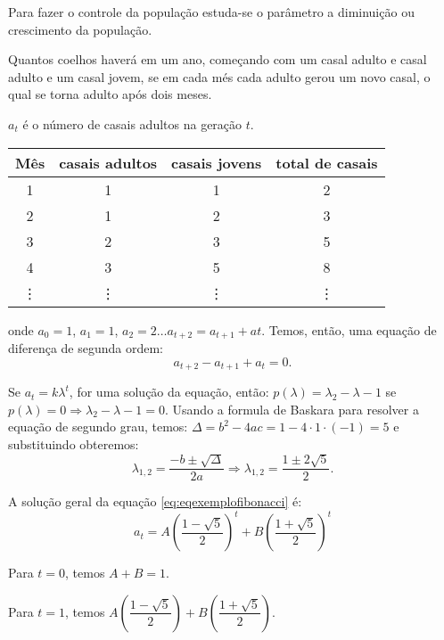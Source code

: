 \begin{remark}
Para fazer o controle da população estuda-se o parâmetro a diminuição ou crescimento da população.
\end{remark}

\begin{example}
Quantos coelhos haverá em um ano, começando com um casal adulto e casal adulto e um casal jovem, se em cada més cada adulto gerou um novo casal, o qual se torna adulto após dois meses. 

$a_t$ é o número de casais adultos na geração $t$.
\end{example}


\begin{table}[!h]\centering
\begin{tabular}{|c|c|c|c|} \hline
Mês & casais adultos & casais jovens & total de casais \\ \hline
1 & 1 & 1 & 2 \\ \hline
2 & 1 & 2 & 3 \\ \hline
3 & 2 & 3 & 5 \\ \hline
4 & 3 & 5 & 8 \\ \hline
\vdots & \vdots & \vdots & \vdots \\ \hline
\end{tabular}
\end{table}
onde $a_0 = 1$, $a_1 = 1$, $a_2 = 2 \ldots a_{t+2} = a_{t+1} + a{t}$. Temos, então, uma equação de diferença de segunda ordem:
\begin{equation}\label{eq:eqexemplofibonacci}
a_{t+2}-a_{t+1} + a_{t} = 0.
\end{equation}

Se $a_t = k\lambda^{t}$, for uma solução da equação, então: $p(\lambda) = \lambda_{2} - \lambda - 1$ se $p(\lambda)=0 \Rightarrow  \lambda_{2} - \lambda - 1=0$. Usando a formula de Baskara para resolver a equação de segundo grau, temos: $\Delta = b^2 - 4ac = 1 - 4 \cdot 1 \cdot (-1) = 5$ e substituindo obteremos:
$$\lambda_{1,2} = \dfrac{-b \pm \sqrt{\Delta}}{2a} 
\Rightarrow \lambda_{1,2} = \dfrac{1 \pm 2\sqrt{5}}{2}.$$

A solução geral da equação \eqref{eq:eqexemplofibonacci} é:
$$a_t = A \left(\dfrac{1-\sqrt{5}}{2}\right)^t + B \left(\dfrac{1+\sqrt{5}}{2}\right)^t$$

Para $t = 0$, temos $A + B = 1$.

Para $t = 1$, temos $A \left(\dfrac{1-\sqrt{5}}{2}\right) + B \left(\dfrac{1+\sqrt{5}}{2}\right)$.

